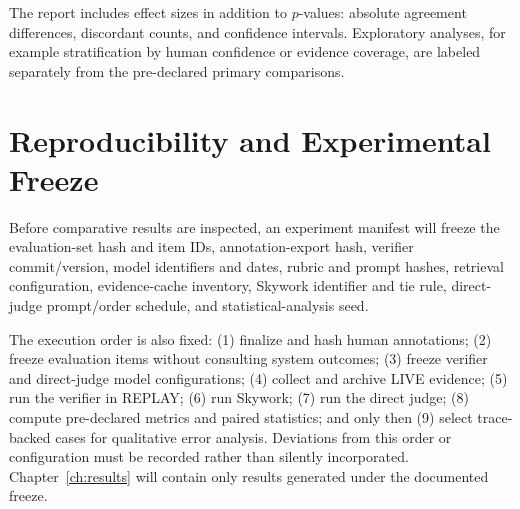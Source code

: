 The report includes effect sizes in addition to $p$-values: absolute agreement differences, discordant counts, and confidence intervals. Exploratory analyses, for example stratification by human confidence or evidence coverage, are labeled separately from the pre-declared primary comparisons.

\section{Reproducibility and Experimental Freeze}
\label{sec:experiment-freeze}

Before comparative results are inspected, an experiment manifest will freeze the evaluation-set hash and item IDs, annotation-export hash, verifier commit/version, model identifiers and dates, rubric and prompt hashes, retrieval configuration, evidence-cache inventory, Skywork identifier and tie rule, direct-judge prompt/order schedule, and statistical-analysis seed.

The execution order is also fixed: (1) finalize and hash human annotations; (2) freeze evaluation items without consulting system outcomes; (3) freeze verifier and direct-judge model configurations; (4) collect and archive LIVE evidence; (5) run the verifier in REPLAY; (6) run Skywork; (7) run the direct judge; (8) compute pre-declared metrics and paired statistics; and only then (9) select trace-backed cases for qualitative error analysis. Deviations from this order or configuration must be recorded rather than silently incorporated. Chapter~\ref{ch:results} will contain only results generated under the documented freeze.
